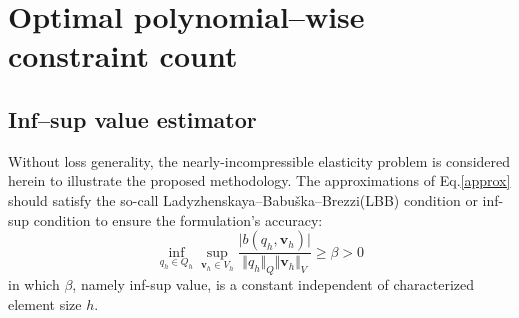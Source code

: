 \section{Optimal polynomial--wise constraint count}
\subsection{Inf--sup value estimator}

Without loss generality, the nearly-incompressible elasticity problem is considered herein to illustrate the proposed methodology.
The approximations of Eq.\eqref{approx} should satisfy the so-call Ladyzhenskaya–Babuška–Brezzi(LBB) condition or inf-sup condition \cite{bathe1996} to ensure the formulation's accuracy:
\begin{equation}\label{infsup}
    \inf_{q_h \in Q_h} \sup_{\boldsymbol v_h \in V_h} \frac{\vert b(q_h,\boldsymbol v_h) \vert}{\Vert q_h \Vert_Q \Vert \boldsymbol v_h \Vert_V} \ge \beta > 0
\end{equation}
in which $\beta$, namely inf-sup value, is a constant independent of characterized element size $h$.

